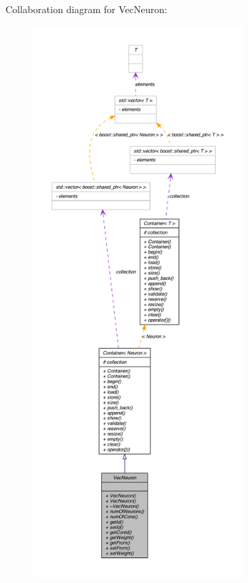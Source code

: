 Collaboration diagram for VecNeuron:
\nopagebreak
\begin{figure}[H]
\begin{center}
\leavevmode
\includegraphics[height=600pt]{class_vec_neuron__coll__graph}
\end{center}
\end{figure}
